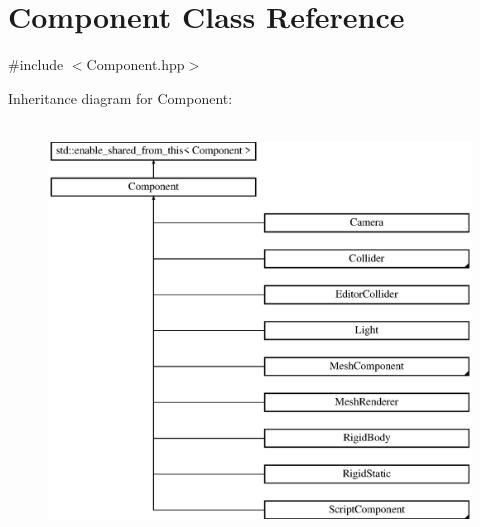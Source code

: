 \hypertarget{class_component}{}\section{Component Class Reference}
\label{class_component}


{\ttfamily \#include $<$Component.\+hpp$>$}

Inheritance diagram for Component\+:\begin{figure}[H]
\begin{center}
\leavevmode
\includegraphics[height=11.000000cm]{class_component}
\end{center}
\end{figure}
